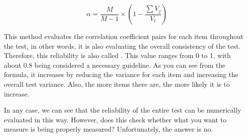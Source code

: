 \documentclass{ltjbook}
\begin{document}
\[  \alpha =   \frac{M}{M-1} \times \left(1-\frac{\sum V_j}{V_t} \right) \]

This method evaluates the correlation coefficient pairs for each item throughout the test, in other words, it is also evaluating the overall consistency of the test. Therefore, this reliability is also called . This value ranges from 0 to 1, with about 0.8 being considered a necessary guideline. As you can see from the formula, it increases by reducing the variance for each item and increasing the overall test variance. Also, the more items there are, the more likely it is to increase.

In any case, we can see that the reliability of the entire test can be numerically evaluated in this way. However, does this check whether what you want to measure is being properly measured? Unfortunately, the answer is no.

\end{document}
